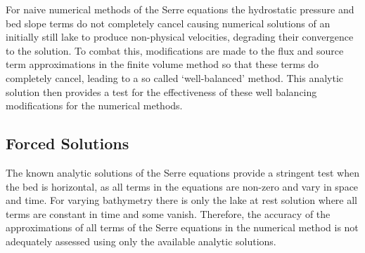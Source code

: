 For naive numerical methods of the Serre equations the hydrostatic pressure and bed slope terms do not completely cancel causing numerical solutions of an initially still lake to produce non-physical velocities, degrading their convergence to the solution. To combat this, modifications are made to the flux and source term approximations in the finite volume method so that these terms do completely cancel, leading to a so called `well-balanced' method. This analytic solution then provides a test for the effectiveness of these well balancing modifications for the numerical methods.


\subsection{Forced Solutions}
The known analytic solutions of the Serre equations provide a stringent test when the bed is horizontal, as all terms in the equations are non-zero and vary in space and time. For varying bathymetry there is only the lake at rest solution where all terms are constant in time and some vanish. Therefore, the accuracy of the approximations of all terms of the Serre equations in the numerical method is not adequately assessed using only the available analytic solutions.

